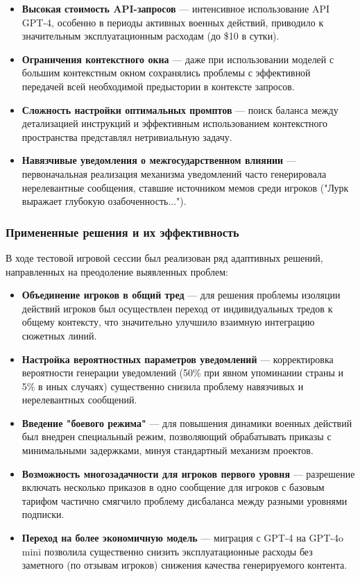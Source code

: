 \begin{itemize}
    \item \textbf{Высокая стоимость API-запросов} — интенсивное использование API GPT-4, особенно в периоды активных военных действий, приводило к значительным эксплуатационным расходам (до \$10 в сутки).

    \item \textbf{Ограничения контекстного окна} — даже при использовании моделей с большим контекстным окном сохранялись проблемы с эффективной передачей всей необходимой предыстории в контексте запросов.

    \item \textbf{Сложность настройки оптимальных промптов} — поиск баланса между детализацией инструкций и эффективным использованием контекстного пространства представлял нетривиальную задачу.

    \item \textbf{Навязчивые уведомления о межгосударственном влиянии} — первоначальная реализация механизма уведомлений часто генерировала нерелевантные сообщения, ставшие источником мемов среди игроков ("{}Лурк выражает глубокую озабоченность..."{}).
\end{itemize}

\subsubsection{Примененные решения и их эффективность}

В ходе тестовой игровой сессии был реализован ряд адаптивных решений, направленных на преодоление выявленных проблем:

\begin{itemize}
    \item \textbf{Объединение игроков в общий тред} — для решения проблемы изоляции действий игроков был осуществлен переход от индивидуальных тредов к общему контексту, что значительно улучшило взаимную интеграцию сюжетных линий.

    \item \textbf{Настройка вероятностных параметров уведомлений} — корректировка вероятности генерации уведомлений (50\% при явном упоминании страны и 5\% в иных случаях) существенно снизила проблему навязчивых и нерелевантных сообщений.

    \item \textbf{Введение "{}боевого режима"{}} — для повышения динамики военных действий был внедрен специальный режим, позволяющий обрабатывать приказы с минимальными задержками, минуя стандартный механизм проектов.

    \item \textbf{Возможность многозадачности для игроков первого уровня} — разрешение включать несколько приказов в одно сообщение для игроков с базовым тарифом частично смягчило проблему дисбаланса между разными уровнями подписки.

    \item \textbf{Переход на более экономичную модель} — миграция с GPT-4 на GPT-4o mini позволила существенно снизить эксплуатационные расходы без заметного (по отзывам игроков) снижения качества генерируемого контента.
\end{itemize}

